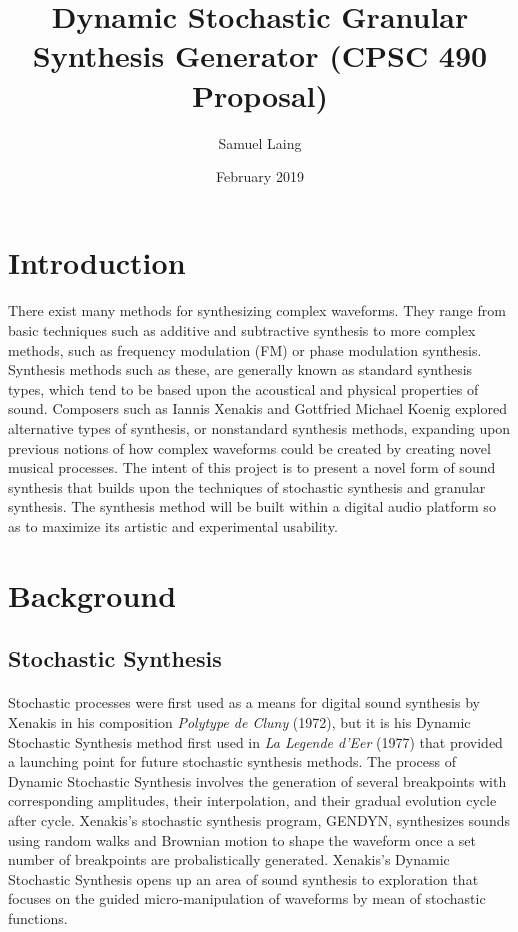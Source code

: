 \documentclass{article}
\title{Dynamic Stochastic Granular Synthesis Generator (CPSC 490 Proposal)}
\author{Samuel Laing}
\date{February 2019}
\begin{document}
\maketitle

\section{Introduction}
\paragraph{}
There exist many methods for synthesizing complex waveforms. They range from basic techniques such as additive and subtractive synthesis to more complex methods, such as frequency modulation (FM) or phase modulation synthesis. Synthesis methods such as these, are generally known as standard synthesis types, which tend to be based upon the acoustical and physical properties of sound. Composers such as Iannis Xenakis and Gottfried Michael Koenig explored alternative types of synthesis, or nonstandard synthesis methods, expanding upon previous notions of how complex waveforms could be created by creating novel musical processes. \citep{luc2011dobereiner} The intent of this project is to present a novel form of sound synthesis that builds upon the techniques of stochastic synthesis and granular synthesis. The synthesis method will be built within a digital audio platform so as to maximize its artistic and experimental usability.

\section{Background}
\subsection{Stochastic Synthesis}
\paragraph{}
Stochastic processes were first used as a means for digital sound synthesis by Xenakis in his composition \textit{Polytype de Cluny} (1972), but it is his Dynamic Stochastic Synthesis method first used in \textit{La Legende d'Eer} (1977) that provided a launching point for future stochastic synthesis methods.\citep{sergio2006} The process of Dynamic Stochastic Synthesis involves the generation of several breakpoints with corresponding amplitudes, their interpolation, and their gradual evolution cycle after cycle. Xenakis's stochastic synthesis program, GENDYN, synthesizes sounds using random walks and Brownian motion to shape the waveform once a set number of breakpoints are probalistically generated.\citep{xenakis1992} Xenakis's Dynamic Stochastic Synthesis opens up an area of sound synthesis to exploration that focuses on the guided micro-manipulation of waveforms by mean of stochastic functions.
\end{document}
